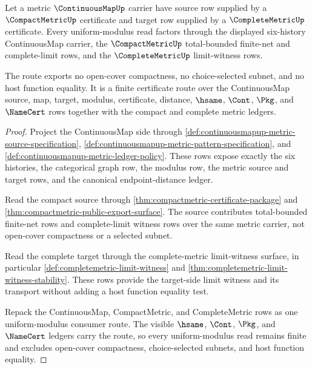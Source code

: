 \begin{theorem}
\label{thm:continuousmap-completemetric-compactmetric-uniform-route}
Let a metric $\ContinuousMapUp$ carrier have source row supplied by a $\CompactMetricUp$ certificate and target row supplied by a $\CompleteMetricUp$ certificate. Every uniform-modulus read factors through the displayed six-history ContinuousMap carrier, the $\CompactMetricUp$ total-bounded finite-net and complete-limit rows, and the $\CompleteMetricUp$ limit-witness rows.

The route exports no open-cover compactness, no choice-selected subnet, and no host function equality. It is a finite certificate route over the ContinuousMap source, map, target, modulus, certificate, distance, $\hsame$, $\Cont$, $\Pkg$, and $\NameCert$ rows together with the compact and complete metric ledgers.
\end{theorem}
\begin{proof}
Project the ContinuousMap side through \autoref{def:continuousmapup-metric-source-specification}, \autoref{def:continuousmapup-metric-pattern-specification}, and \autoref{def:continuousmapup-metric-ledger-policy}. These rows expose exactly the six histories, the categorical graph row, the modulus row, the metric source and target rows, and the canonical endpoint-distance ledger.

Read the compact source through \autoref{thm:compactmetric-certificate-package} and \autoref{thm:compactmetric-public-export-surface}. The source contributes total-bounded finite-net rows and complete-limit witness rows over the same metric carrier, not open-cover compactness or a selected subnet.

Read the complete target through the complete-metric limit-witness surface, in particular \autoref{def:completemetric-limit-witness} and \autoref{thm:completemetric-limit-witness-stability}. These rows provide the target-side limit witness and its transport without adding a host function equality test.

Repack the ContinuousMap, CompactMetric, and CompleteMetric rows as one uniform-modulus consumer route. The visible $\hsame$, $\Cont$, $\Pkg$, and $\NameCert$ ledgers carry the route, so every uniform-modulus read remains finite and excludes open-cover compactness, choice-selected subnets, and host function equality.
\end{proof}


